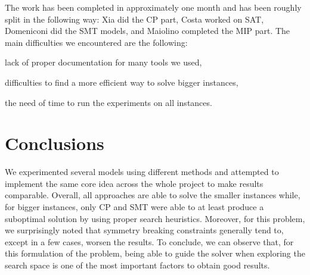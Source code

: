 \documentclass{article}
\begin{document}
    The work has been completed in approximately one month and has been roughly split in the following way: Xia did the CP part, Costa worked on SAT, Domeniconi did the SMT models, and Maiolino completed the MIP part. The main difficulties we encountered are the following: 
    \begin{enumerate*}[label=(\roman*)]
        \item lack of proper documentation for many tools we used,
        \item difficulties to find a more efficient way to solve bigger instances,
        \item the need of time to run the experiments on all instances.
    \end{enumerate*}


    
    
    
    


    \section{Conclusions}

    We experimented several models using different methods and attempted to implement the same core idea across the whole project to make results comparable. Overall, all approaches are able to solve the smaller instances while, for bigger instances, only CP and SMT were able to at least produce a suboptimal solution by using proper search heuristics. Moreover, for this problem, we surprisingly noted that symmetry breaking constraints generally tend to, except in a few cases, worsen the results. To conclude, we can observe that, for this formulation of the problem, being able to guide the solver when exploring the search space is one of the most important factors to obtain good results.

    \printbibliography
\end{document}
